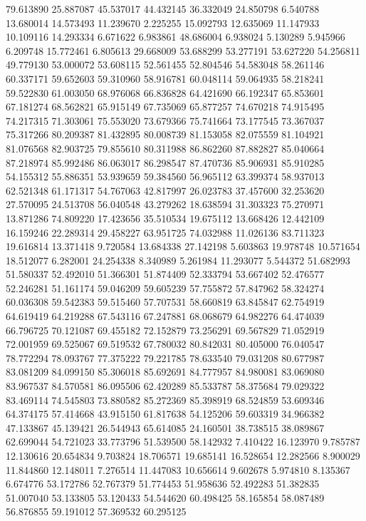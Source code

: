 79.613890
25.887087
45.537017
44.432145
36.332049
24.850798
6.540788
13.680014
14.573493
11.239670
2.225255
15.092793
12.635069
11.147933
10.109116
14.293334
6.671622
6.983861
48.686004
6.938024
5.130289
5.945966
6.209748
15.772461
6.805613
29.668009
53.688299
53.277191
53.627220
54.256811
49.779130
53.000072
53.608115
52.561455
52.804546
54.583048
58.261146
60.337171
59.652603
59.310960
58.916781
60.048114
59.064935
58.218241
59.522830
61.003050
68.976068
66.836828
64.421690
66.192347
65.853601
67.181274
68.562821
65.915149
67.735069
65.877257
74.670218
74.915495
74.217315
71.303061
75.553020
73.679366
75.741664
73.177545
73.367037
75.317266
80.209387
81.432895
80.008739
81.153058
82.075559
81.104921
81.076568
82.903725
79.855610
80.311988
86.862260
87.882827
85.040664
87.218974
85.992486
86.063017
86.298547
87.470736
85.906931
85.910285
54.155312
55.886351
53.939659
59.384560
56.965112
63.399374
58.937013
62.521348
61.171317
54.767063
42.817997
26.023783
37.457600
32.253620
27.570095
24.513708
56.040548
43.279262
18.638594
31.303323
75.270971
13.871286
74.809220
17.423656
35.510534
19.675112
13.668426
12.442109
16.159246
22.289314
29.458227
63.951725
74.032988
11.026136
83.711323
19.616814
13.371418
9.720584
13.684338
27.142198
5.603863
19.978748
10.571654
18.512077
6.282001
24.254338
8.340989
5.261984
11.293077
5.544372
51.682993
51.580337
52.492010
51.366301
51.874409
52.333794
53.667402
52.476577
52.246281
51.161174
59.046209
59.605239
57.755872
57.847962
58.324274
60.036308
59.542383
59.515460
57.707531
58.660819
63.845847
62.754919
64.619419
64.219288
67.543116
67.247881
68.068679
64.982276
64.474039
66.796725
70.121087
69.455182
72.152879
73.256291
69.567829
71.052919
72.001959
69.525067
69.519532
67.780032
80.842031
80.405000
76.040547
78.772294
78.093767
77.375222
79.221785
78.633540
79.031208
80.677987
83.081209
84.099150
85.306018
85.692691
84.777957
84.980081
83.069080
83.967537
84.570581
86.095506
62.420289
85.533787
58.375684
79.029322
83.469114
74.545803
73.880582
85.272369
85.398919
68.524859
53.609346
64.374175
57.414668
43.915150
61.817638
54.125206
59.603319
34.966382
47.133867
45.139421
26.544943
65.614085
24.160501
38.738515
38.089867
62.699044
54.721023
33.773796
51.539500
58.142932
7.410422
16.123970
9.785787
12.130616
20.654834
9.703824
18.706571
19.685141
16.528654
12.282566
8.900029
11.844860
12.148011
7.276514
11.447083
10.656614
9.602678
5.974810
8.135367
6.674776
53.172786
52.767379
51.774453
51.958636
52.492283
51.382835
51.007040
53.133805
53.120433
54.544620
60.498425
58.165854
58.087489
56.876855
59.191012
57.369532
60.295125
